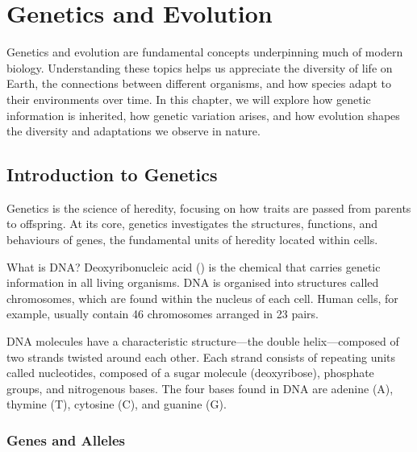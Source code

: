 \chapter{Genetics and Evolution}

Genetics and evolution are fundamental concepts underpinning much of modern biology. Understanding these topics helps us appreciate the diversity of life on Earth, the connections between different organisms, and how species adapt to their environments over time. In this chapter, we will explore how genetic information is inherited, how genetic variation arises, and how evolution shapes the diversity and adaptations we observe in nature.

\section{Introduction to Genetics}

Genetics is the science of heredity, focusing on how traits are passed from parents to offspring. At its core, genetics investigates the structures, functions, and behaviours of genes, the fundamental units of heredity located within cells.


\begin{keyconcept}{What is DNA?}
Deoxyribonucleic acid () is the chemical that carries genetic information in all living organisms. DNA is organised into structures called chromosomes, which are found within the nucleus of each cell. Human cells, for example, usually contain 46 chromosomes arranged in 23 pairs.
\end{keyconcept}

DNA molecules have a characteristic structure—the double helix—composed of two strands twisted around each other. Each strand consists of repeating units called nucleotides, composed of a sugar molecule (deoxyribose), phosphate groups, and nitrogenous bases. The four bases found in DNA are adenine (A), thymine (T), cytosine (C), and guanine (G). 


\subsection{Genes and Alleles}

